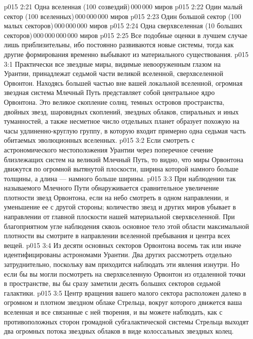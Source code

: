 \vs p015 2:21 Одна вселенная (100 созвездий)\,000\,000 миров
\vs p015 2:22 Один малый сектор (100 вселенных)\,000\,000\,000 миров
\vs p015 2:23 Один большой сектор (100 малых секторов)\,000\,000\,000 миров
\vs p015 2:24 Одна сверхвселенная (10 больших секторов)\,000\,000\,000\,000 миров
\vs p015 2:25 \pc Все подобные оценки в лучшем случае лишь приблизительны, ибо постоянно развиваются новые системы, тогда как другие формирования временно выбывают из материального существования.
\vs p015 3:1 Практически все звездные миры, видимые невооруженным глазом на Урантии, принадлежат седьмой части великой вселенной, сверхвселенной Орвонтон. Находясь большей частью вне вашей локальной вселенной, огромная звездная система Млечный Путь представляет собой центральное ядро Орвонтона. Это великое скопление солнц, темных островов пространства, двойных звезд, шаровидных скоплений, звездных облаков, спиральных и иных туманностей, а также несметное число отдельных планет образует похожую на часы удлиненно\hyp{}круглую группу, в которую входит примерно одна седьмая часть обитаемых эволюционных вселенных.
\vs p015 3:2 Если смотреть с астрономического местоположения Урантии через поперечное сечение близлежащих систем на великий Млечный Путь, то видно, что миры Орвонтона движутся по огромной вытянутой плоскости, ширина которой намного больше толщины, а длина --- намного больше ширины.
\vs p015 3:3 При наблюдении так называемого Млечного Пути обнаруживается сравнительное увеличение плотности звезд Орвонтона, если на небо смотреть в одном направлении, и уменьшение ее с другой стороны; количество звезд и других миров убывает в направлении от главной плоскости нашей материальной сверхвселенной. При благоприятном угле наблюдения сквозь основное тело этой области максимальной плотности вы смотрите в направлении вселенной пребывания и центра всех вещей.
\vs p015 3:4 \pc Из десяти основных секторов Орвонтона восемь так или иначе идентифицированы астрономами Урантии. Два других рассмотреть отдельно затруднительно, поскольку вам приходится наблюдать эти явления изнутри. Но если бы вы могли посмотреть на сверхвселенную Орвонтон из отдаленной точки в пространстве, вы бы сразу заметили десять больших секторов седьмой галактики.
\vs p015 3:5 Центр вращения вашего малого сектора расположен далеко в огромном и плотном звездном облаке Стрельца, вокруг которого движется ваша вселенная и все связанные с ней творения, и вы можете наблюдать, как с противоположных сторон громадной субгалактической системы Стрельца выходят два огромных потока звездных облаков в виде колоссальных звездных колец.

